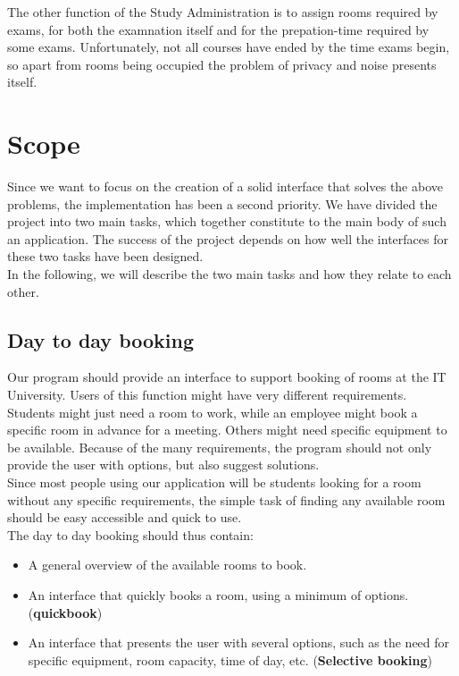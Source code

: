 The other function of the Study Administration is to assign rooms required by exams, for both the examnation itself and for the prepation-time required by some exams. Unfortunately, not all courses have ended by the time exams begin, so apart from rooms being occupied the problem of privacy and noise presents itself.\\

\label{sec:scope}
\section{Scope}
 Since we want to focus on the creation of a solid interface that solves the above problems, the implementation has been a second priority. We have divided the project into two main tasks, which together constitute to the main body of such an application. The success of the project depends on how well the interfaces for these two tasks have been designed.\\
In the following, we will describe the two main tasks and how they relate to each other.

\subsection{Day to day booking}
Our program should provide an interface to support booking of rooms at the IT University. Users of this function might have very different requirements. Students might just need a room to work, while an employee might book a specific room in advance for a meeting. Others might need specific equipment to be available. Because of the many requirements, the program should not only provide the user with options, but also suggest solutions.\\
Since most people using our application will be students looking for a room without any specific requirements, the simple task of finding any available room should be easy accessible and quick to use. \\

The day to day booking should thus contain:

\begin{itemize}
	\item A general overview of the available rooms to book.
	\item An interface that quickly books a room, using a minimum of options. (\textbf{quickbook})
	\item An interface that presents the user with several options, such as the need for specific equipment, room capacity, time of day, etc. (\textbf{Selective booking})
\end{itemize}

